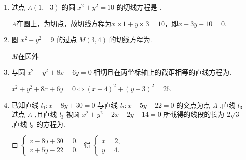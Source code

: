\begin{enumerate}
    \item 过点 $A\left( {1, - 3}\right)$ 的圆 ${x}^{2} + {y}^{2} = {10}$ 的切线方程是 .
    \begin{jieda}
        $A$在圆上，为切点，故切线方程为$x\times1+y\times3 = 10$，即$x-3y-10=0$.
    \end{jieda}

    \item 圆 ${x}^{2} + {y}^{2} = 9$ 的过点 $M\left( {3,4}\right)$ 的切线方程为.
    \begin{jieda}
        $M$在圆外
    \end{jieda}
    \item 与圆 ${x}^{2} + {y}^{2} + {8x} + {6y} = 0$ 相切且在两坐标轴上的截距相等的直线方程为.
    \begin{jieda}
        ${x}^{2} + {y}^{2} + {8x} + {6y} = 0 \Longleftrightarrow (x+4)^2+(y+3)^2 = 25$.
        
    \end{jieda}

    \item 已知直线 ${l}_{1} : x - {8y} + {30} = 0$ 与直线 ${l}_{2} : x + {5y} - {22} = 0$ 的交点为点 $A$ ,直线 ${l}_{3}$ 过点 $A$ ,且直线 ${l}_{3}$ 被圆 ${x}^{2} + {y}^{2} - {2x} + {2y} - {14} = 0$ 所截得的线段的长为 $2\sqrt{3}$ ,直线 ${l}_{3}$ 的方程为.
    \begin{jieda}
        由 $\left\{\begin{array}{l}x-8 y+30=0, \\ x+5 y-22=0,\end{array}\right.$ 得 $\left\{\begin{array}{l}x=2, \\ y=4 .\end{array}\right.$ 
        

\end{jieda}
\end{enumerate}

